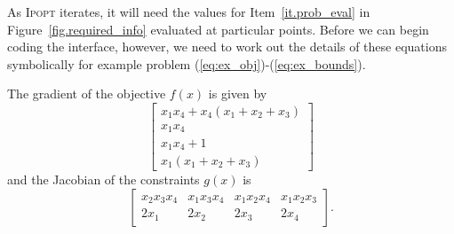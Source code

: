 \documentclass[10pt]{article}
\newcommand{\Ipopt}{\textsc{Ipopt}\xspace}
\begin{document}
As \Ipopt iterates, it will need the values for
Item~\ref{it.prob_eval} in Figure~\ref{fig.required_info} evaluated at
particular points. Before we can begin coding the interface, however,
we need to work out the details of these equations symbolically for
example problem (\ref{eq:ex_obj})-(\ref{eq:ex_bounds}).

The gradient of the objective $f(x)$ is given by
\[
\left[
\begin{array}{c}
x_1 x_4 + x_4 (x_1 + x_2 + x_3) \\
x_1 x_4 \\
x_1 x_4 + 1 \\
x_1 (x_1 + x_2 + x_3)
\end{array}
\right]
\]
and the Jacobian of the constraints $g(x)$ is
\[
\left[
\begin{array}{cccc}
x_2 x_3 x_4     & x_1 x_3 x_4   & x_1 x_2 x_4   & x_1 x_2 x_3   \\
2 x_1           & 2 x_2         & 2 x_3         & 2 x_4
\end{array}
\right].
\]
\end{document}
